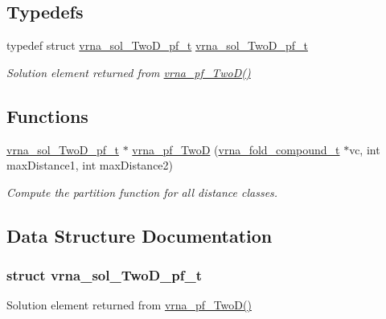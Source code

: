 \subsection*{Typedefs}
\begin{DoxyCompactItemize}
\item 
typedef struct \mbox{\hyperlink{group__kl__neighborhood__pf_structvrna__sol___two_d__pf__t}{vrna\+\_\+sol\+\_\+\+Two\+D\+\_\+pf\+\_\+t}} \mbox{\hyperlink{group__kl__neighborhood__pf_ga5e449fbd695406aabd2bcabddc374621}{vrna\+\_\+sol\+\_\+\+Two\+D\+\_\+pf\+\_\+t}}
\begin{DoxyCompactList}\small\item\em Solution element returned from \mbox{\hyperlink{group__kl__neighborhood__pf_ga0bc3427689bd09da09b8b3094a27f836}{vrna\+\_\+pf\+\_\+\+Two\+D()}} \end{DoxyCompactList}\end{DoxyCompactItemize}
\subsection*{Functions}
\begin{DoxyCompactItemize}
\item 
\mbox{\hyperlink{group__kl__neighborhood__pf_structvrna__sol___two_d__pf__t}{vrna\+\_\+sol\+\_\+\+Two\+D\+\_\+pf\+\_\+t}} $\ast$ \mbox{\hyperlink{group__kl__neighborhood__pf_ga0bc3427689bd09da09b8b3094a27f836}{vrna\+\_\+pf\+\_\+\+TwoD}} (\mbox{\hyperlink{group__fold__compound_ga1b0cef17fd40466cef5968eaeeff6166}{vrna\+\_\+fold\+\_\+compound\+\_\+t}} $\ast$vc, int max\+Distance1, int max\+Distance2)
\begin{DoxyCompactList}\small\item\em Compute the partition function for all distance classes. \end{DoxyCompactList}\end{DoxyCompactItemize}


\subsection{Data Structure Documentation}
\label{structvrna__sol___two_d__pf__t}
\subsubsection{struct vrna\+\_\+sol\+\_\+\+Two\+D\+\_\+pf\+\_\+t}
Solution element returned from \mbox{\hyperlink{group__kl__neighborhood__pf_ga0bc3427689bd09da09b8b3094a27f836}{vrna\+\_\+pf\+\_\+\+Two\+D()}} 

